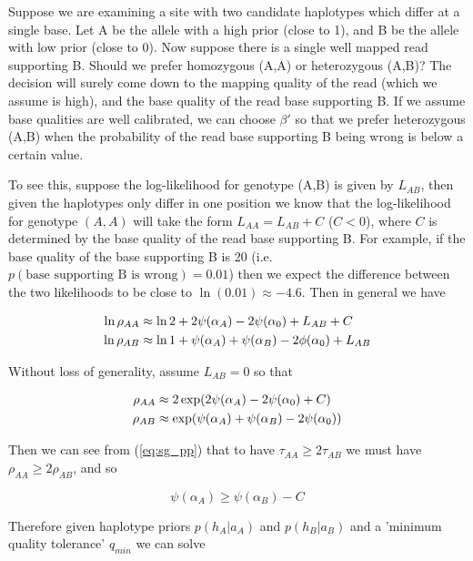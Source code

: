\documentclass{article}
\begin{document}
Suppose we are examining a site with two candidate haplotypes which differ at a single base. Let A be the allele with a high prior (close to 1), and B be the allele with low prior (close to 0). Now suppose there is a single well mapped read supporting B. Should we prefer homozygous (A,A) or heterozygous (A,B)? The decision will surely come down to the mapping quality of the read (which we assume is high), and the base quality of the read base supporting B. If we assume base qualities are well calibrated, we can choose $\beta'$ so that we prefer heterozygous (A,B) when the probability of the read base supporting B being wrong is below a certain value.

To see this, suppose the log-likelihood for genotype (A,B) is given by $L_{AB}$, then given the haplotypes only differ in one position we know that the log-likelihood for genotype $(A,A)$ will take the form $L_{AA} = L_{AB} + C$ ($C < 0$), where $C$ is determined by the base quality of the read base supporting B. For example, if the base quality of the base supporting B is 20 (i.e. $p(\text{base supporting B is wrong}) = 0.01$) then we expect the difference between the two likelihoods to be close to $\ln(0.01) \approx -4.6$. Then in general we have

\begin{align}
\ln \rho_{AA} &\approx \ln 2 + 2 \psi(\alpha_A) - 2 \psi(\alpha_0) + L_{AB} + C \notag \\
\ln \rho_{AB} &\approx \ln 1 + \psi(\alpha_A) + \psi(\alpha_B) - 2 \phi(\alpha_0) + L_{AB} \notag
\end{align}

Without loss of generality, assume $L_{AB} = 0$ so that

\begin{align}
\rho_{AA} &\approx 2 \exp(2 \psi(\alpha_A) - 2 \psi(\alpha_0) + C) \notag \\
\rho_{AB} &\approx \exp(\psi(\alpha_A) + \psi(\alpha_B) - 2 \psi(\alpha_0)) \notag
\end{align}

Then we can see from (\ref{eq:sg_pp}) that to have $\tau_{AA} \ge 2 \tau_{AB}$ we must have $\rho_{AA} \ge 2 \rho_{AB}$, and so

\begin{equation}
    \psi(\alpha_A) \ge \psi(\alpha_B) - C
\end{equation}

Therefore given haplotype priors $p(h_A | a_A)$ and $p(h_B | a_B)$ and a 'minimum quality tolerance' $q_{min}$ we can solve
\end{document}
